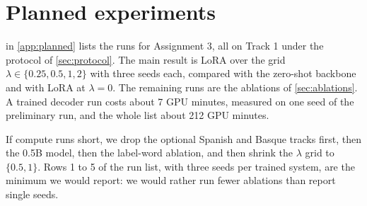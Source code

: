 \section{Planned experiments}
\label{sec:planned}

 in \cref{app:planned} lists the runs for Assignment 3, all on Track 1 under the protocol of \cref{sec:protocol}. The main result is LoRA over the grid $\lambda \in \{0.25, 0.5, 1, 2\}$ with three seeds each, compared with the zero-shot backbone and with LoRA at $\lambda = 0$. The remaining runs are the ablations of \cref{sec:ablations}. A trained decoder run costs about 7 GPU minutes, measured on one seed of the preliminary run, and the whole list about 212 GPU minutes.

If compute runs short, we drop the optional Spanish and Basque tracks first, then the 0.5B model, then the label-word ablation, and then shrink the $\lambda$ grid to $\{0.5, 1\}$. Rows 1 to 5 of the run list, with three seeds per trained system, are the minimum we would report: we would rather run fewer ablations than report single seeds.
